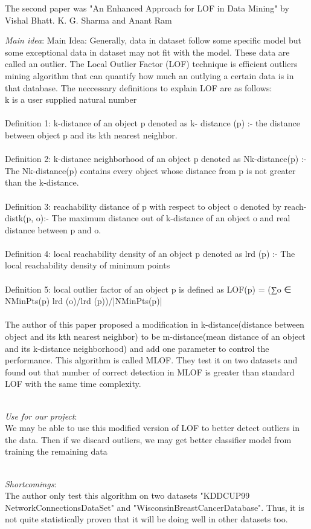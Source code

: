 The second paper was "An Enhanced Approach for LOF in Data Mining" by Vishal Bhatt. K. G. Sharma and Anant Ram
\begin{itemize*}
\item {\em Main idea}:
Main Idea: Generally, data in dataset follow some specific model but some exceptional data in dataset may not fit with the model. These data are called an outlier. The Local Outlier Factor (LOF) technique is efficient outliers mining algorithm that can quantify how much an outlying a certain data is in that database. The neccessary definitions to explain LOF are as follows:
\\
k is a user supplied natural number\\\\
Definition 1: k-distance of an object p denoted as k- distance (p) :- the distance between object p and its kth nearest neighbor. \\\\
Definition 2: k-distance neighborhood of an object p denoted as Nk-distance(p) :- The
Nk-distance(p) contains every object whose distance from p is not greater than the k-distance.\\\\
Definition 3: reachability distance of p with respect to object o denoted by reach-distk(p, o):- The maximum distance out of k-distance of an object o and real distance between p and o.\\\\
Definition 4: local reachability density of an object p denoted as lrd (p) :- The local reachability density of minimum points
\\\\
Definition 5: local outlier factor of an object p is defined as
LOF(p) = (∑o ∈ NMinPts(p)  lrd (o)/lrd (p))/|NMinPts(p)|
\\\\
The author of this paper proposed a modification in k-distance(distance between object and its kth nearest neighbor) to be m-distance(mean distance of an object and its k-distance neighborhood) and add one parameter to control the performance. This algorithm is called MLOF. They test it on two datasets and found out that number of correct detection in MLOF is greater than standard LOF with the same time complexity.\\\\

\item {\em Use for our project}:\\
We may be able to use this modified version of LOF to better detect outliers in the data. Then if we discard outliers, we may get better classifier model from training the remaining data\\\\
\item {\em Shortcomings}:\\
The author only test this algorithm on two datasets "KDDCUP99 NetworkConnectionsDataSet" and "WisconsinBreastCancerDatabase". Thus, it is not quite statistically proven that it will be doing well in other datasets too.

\end{itemize*}

